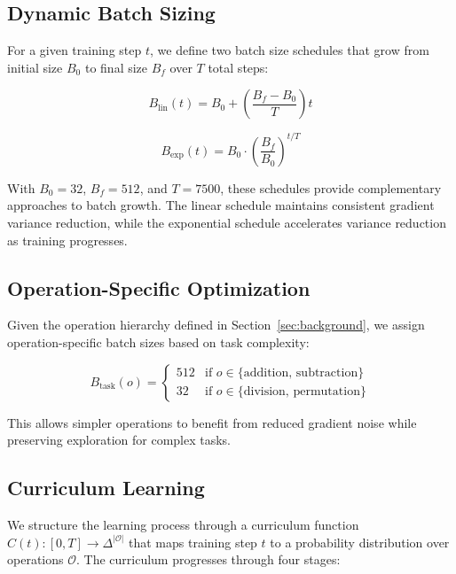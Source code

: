 \documentclass{article} %
\begin{document}
\subsection{Dynamic Batch Sizing}
For a given training step $t$, we define two batch size schedules that grow from initial size $B_0$ to final size $B_f$ over $T$ total steps:

\begin{equation}
    B_{\text{lin}}(t) = B_0 + \left(\frac{B_f - B_0}{T}\right)t
\end{equation}

\begin{equation}
    B_{\text{exp}}(t) = B_0 \cdot \left(\frac{B_f}{B_0}\right)^{t/T}
\end{equation}

With $B_0=32$, $B_f=512$, and $T=7500$, these schedules provide complementary approaches to batch growth. The linear schedule maintains consistent gradient variance reduction, while the exponential schedule accelerates variance reduction as training progresses.

\subsection{Operation-Specific Optimization}
Given the operation hierarchy defined in Section~\ref{sec:background}, we assign operation-specific batch sizes based on task complexity:

\begin{equation}
    B_{\text{task}}(o) = \begin{cases}
        512 & \text{if } o \in \{\text{addition, subtraction}\} \\
        32 & \text{if } o \in \{\text{division, permutation}\}
    \end{cases}
\end{equation}

This allows simpler operations to benefit from reduced gradient noise while preserving exploration for complex tasks.

\subsection{Curriculum Learning}
We structure the learning process through a curriculum function $C(t): [0,T] \rightarrow \Delta^{|\mathcal{O}|}$ that maps training step $t$ to a probability distribution over operations $\mathcal{O}$. The curriculum progresses through four stages:
\end{document}
